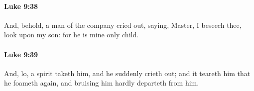 		\paragraph{Luke 9:38} %
			\label{LUKE-9-38}

			And, behold, a man of the company cried out, saying, Master, I beseech thee, look upon my son: for he is mine only child.

			\begin{framed}
			\scriptsize
				\begin{compactdesc}
					\item[SBLG] 
				\end{compactdesc}
			\end{framed}

		\paragraph{Luke 9:39} %
			\label{LUKE-9-39}

			And, lo, a spirit taketh him, and he suddenly crieth out; and it teareth him that he foameth again, and bruising him hardly departeth from him.

